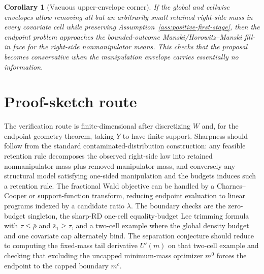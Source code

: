 \documentclass[11pt]{article}
\theoremstyle{definition}
\theoremstyle{plain}
\newtheorem{corollary}{Corollary}
\theoremstyle{remark}
\begin{document}
\begin{corollary}[Vacuous upper-envelope corner]\label{cor:manski-corner}
If the global and cellwise envelopes allow removing all but an arbitrarily small retained
right-side mass in every covariate cell while preserving Assumption~\ref{ass:positive-first-stage},
then the endpoint problem approaches the bounded-outcome Manski/Horowitz--Manski fill-in
face for the right-side nonmanipulator means.  This checks that the proposal becomes
conservative when the manipulation envelope carries essentially no information.
\end{corollary}

\section{Proof-sketch route}
The verification route is finite-dimensional after discretizing \(W\) and, for the endpoint
geometry theorem, taking \(Y\) to have finite support.  Sharpness should follow from the
standard contaminated-distribution construction: any feasible retention rule decomposes the
observed right-side law into retained nonmanipulator mass plus removed manipulator mass, and
conversely any structural model satisfying one-sided manipulation and the budgets induces
such a retention rule.  The fractional Wald objective can be handled by a Charnes--Cooper
or support-function transform, reducing endpoint evaluation to linear programs indexed by
a candidate ratio \(\lambda\).  The boundary checks are the zero-budget singleton, the
sharp-RD one-cell equality-budget Lee trimming formula with \(\tau\le\bar\rho\) and
\(\bar s_1\ge\tau\), and a two-cell example where the global density budget and one
covariate cap alternately bind.  The
separation conjecture should reduce to computing the fixed-mass tail derivative \(U'(m)\)
on that two-cell example and checking that excluding the uncapped minimum-mass optimizer \(m^0\) forces
the endpoint to the capped boundary \(m^c\).
\end{document}
